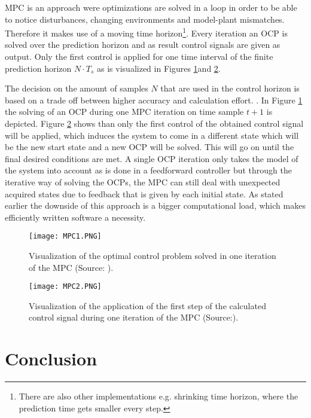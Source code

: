 MPC is an approach were optimizations are solved in a loop in order to be able to notice disturbances, changing environments and model-plant mismatches. Therefore it makes use of a moving time horizon\footnote{There are also other implementations e.g. shrinking time horizon, where the prediction time gets smaller every step.}. Every iteration an OCP is solved over the prediction horizon and as result control signals are given as output. Only the first control is applied for one time interval of the finite prediction horizon $N\cdot T_{s}$ as is visualized in Figures \ref{fig:MPC1}and \ref{fig:MPC2}.

The decision on the amount of samples $N$ that are used in the control horizon is based on a trade off between higher accuracy and calculation effort. \cite{TongDuySon2019, Mercy2018}. In Figure \ref{fig:MPC1} the solving of an OCP during one MPC iteration on time sample $t+1$ is depicted. Figure \ref{fig:MPC2} shows than only the first control of the obtained control signal will be applied, which induces the system to come in a different state which will be the new start state and a new OCP will be solved. This will go on until the final desired conditions are met. A single OCP iteration only takes the model of the system into account as is done in a feedforward controller but through the iterative way of solving the OCPs, the MPC can still deal with unexpected acquired states due to feedback that is given by each initial state. As stated earlier the downside of this approach is a bigger computational load, which makes efficiently written software a necessity.  \cite{Patrinos2019}\\

\begin{figure}[h!]
	\centering
	\texttt{[image: MPC1.PNG]}
	\caption{Visualization of the optimal control problem solved in one iteration of the MPC (Source: \cite{Patrinos2019}).}
	\label{fig:MPC1}
\end{figure}

\begin{figure}[h!]
	\centering
	\texttt{[image: MPC2.PNG]}
	\caption{Visualization of the application of the first step of the calculated control signal during one iteration of the MPC (Source:\cite{Patrinos2019}).}
	\label{fig:MPC2}
\end{figure}


\section{Conclusion}




